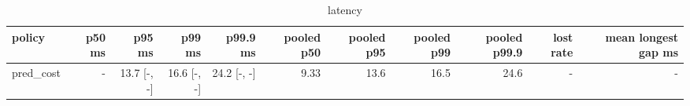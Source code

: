 \begin{table}[t]\centering\small
\begin{tabular}{lrrrrrrrrrr}\toprule
policy & p50 ms & p95 ms & p99 ms & p99.9 ms & pooled p50 & pooled p95 & pooled p99 & pooled p99.9 & lost rate & mean longest gap ms \\\midrule
pred\_cost & - & 13.7 [-, -] & 16.6 [-, -] & 24.2 [-, -] & 9.33 & 13.6 & 16.5 & 24.6 & - & - \\
\bottomrule\end{tabular}\caption{latency}\end{table}
